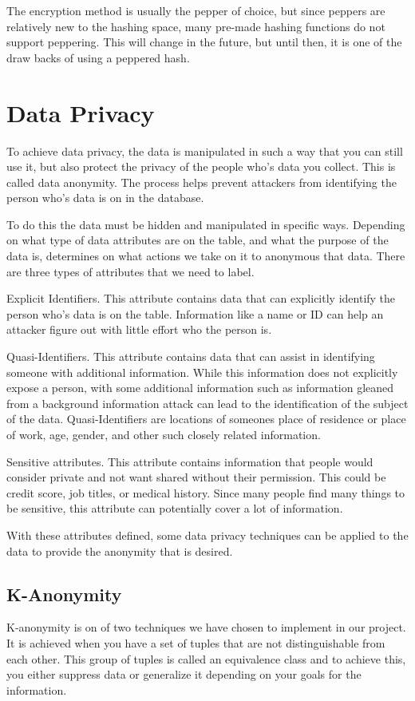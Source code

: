 \documentclass[12pt]{article}
\begin{document}
The encryption method is usually the pepper of choice, but since peppers are relatively new to the hashing space, many pre-made hashing functions do not support peppering. This will change in the future, but until then, it is one of the draw backs of using a peppered hash. 

\section{Data Privacy}
To achieve data privacy, the data is manipulated in such a way that you can still use it, but also protect the privacy of the people who's data you collect. This is called data anonymity. The process helps prevent attackers from identifying the person who's data is on in the database. 

To do this the data must be hidden and manipulated in specific ways. Depending on what type of data attributes are on the table, and what the purpose of the data is, determines on what actions we take on it to anonymous that data. There are three types of attributes that we need to label. 

Explicit Identifiers. This attribute contains data that can explicitly identify the person who's data is on the table. Information like a name or ID can help an attacker figure out with little effort who the person is. 

Quasi-Identifiers. This attribute contains data that can assist in identifying someone with additional information. While this information does not explicitly expose a person, with some additional information such as information gleaned from a background information attack can lead to the identification of the subject of the data. Quasi-Identifiers are locations of someones place of residence or place of work, age, gender, and other such closely related information. 

Sensitive attributes. This attribute contains information that people would consider private and not want shared without their permission. This could be credit score, job titles, or medical history. Since many people find many things to be sensitive, this attribute can potentially cover a lot of information.

With these attributes defined, some data privacy techniques can be applied to the data to provide the anonymity that is desired. 

\subsection{\indent K-Anonymity}
K-anonymity is on of two techniques we have chosen to implement in our project. It is achieved when you have a set of tuples that are not distinguishable from each other. This group of tuples is called an equivalence class and to achieve this, you either suppress data or generalize it depending on your goals for the information.
\end{document}
